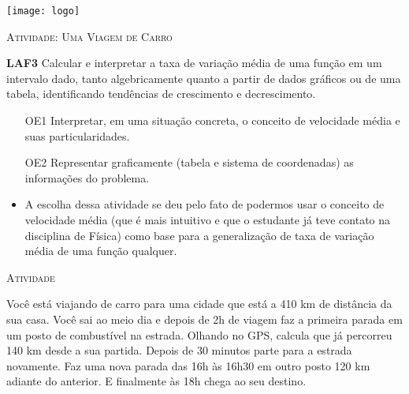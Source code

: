 \documentclass[10 pt,usenames,dvipsnames, oneside]{article}
\begin{document}
\begin{center}
  \begin{minipage}[l]{3cm}
\texttt{[image: logo]}    
\end{minipage}\hfill
\begin{minipage}[r]{.8\textwidth}
 {\Large \scshape Atividade: Uma Viagem de Carro}  
\end{minipage}
\end{center}
\vspace{.2cm}

\ifdefined\prof
\begin{objetivos}
\item \textbf{LAF3} Calcular e interpretar a taxa de variação média de uma função em um intervalo dado, tanto algebricamente quanto a partir de dados gráficos ou de uma tabela, identificando tendências de crescimento e decrescimento.
\end{objetivos}

\begin{goals}
\begin{enumerate}

\item [OE1] Interpretar, em uma situação concreta, o conceito de velocidade média e suas particularidades.

\item [OE2] Representar graficamente (tabela e sistema de coordenadas) as informações do problema.

\end{enumerate}

\tcblower
\begin{itemize}
\item A escolha dessa atividade se deu pelo fato de podermos usar o conceito de velocidade
média (que é mais intuitivo e que o estudante já teve contato na disciplina de Física)
como base para a generalização de taxa de variação média de uma função qualquer.
\end{itemize}
\end{goals}

\bigskip
\begin{center}
{\large \scshape Atividade}
\end{center}
\fi

Você está viajando de carro para uma cidade que está a 410 km de distância da sua casa. Você sai ao meio dia e depois de 2h de viagem faz a primeira parada em um posto de combustível na estrada. Olhando no GPS, calcula que já percorreu 140 km desde a sua partida. Depois de 30 minutos parte para a estrada novamente. Faz uma nova parada das 16h às 16h30 em outro posto 120 km adiante do anterior. E finalmente às 18h chega ao seu destino.
\end{document}
